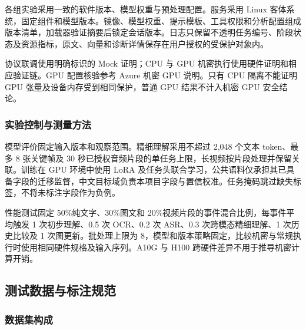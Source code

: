 各组实验采用一致的软件版本、模型权重与预处理配置。服务采用 Linux 客体系统，固定组件和模型版本。镜像、模型权重、提示模板、工具权限和分析配置组成版本清单，加载器验证摘要后锁定会话版本。日志只保留不透明任务编号、阶段状态及资源指标，原文、向量和诊断详情保存在用户授权的受保护对象内。

协议联调使用明确标识的 Mock 证明；CPU 与 GPU 机密执行使用硬件证明和相应验证链。GPU 配置核验参考 Azure 机密 GPU 说明\cite{ref33}。只有 CPU 隔离不能证明 GPU 张量及设备内存受到相同保护，普通 GPU 结果不计入机密 GPU 安全结论。

\subsubsection{实验控制与测量方法}\label{section:3.2.3}

模型评价固定输入版本和观察范围。精细理解采用不超过 2,048 个文本 token、最多 8 张关键帧及 30 秒已授权音频片段的单任务上限，长视频按片段处理并保留关联。训练在 GPU 环境中使用 LoRA 及任务头联合学习，公共语料仅承担其已具备字段的迁移监督，中文目标域负责本项目字段与置信校准。任务掩码跳过缺失标签，不将未标注字段作为负例。

性能测试固定 50\%纯文字、30\%图文和 20\%视频片段的事件混合比例，每事件平均触发 1 次初步理解、0.5 次 OCR、0.2 次 ASR、0.3 次跨模态精细理解、1 次历史比较及 1 次图更新。批处理上限为 8，模型和版本策略固定，比较机密与常规执行时使用相同硬件规格及输入序列。A10G 与 H100 跨硬件差异不用于推导机密计算开销。

\subsection{测试数据与标注规范}\label{section:3.3}

\subsubsection{数据集构成}\label{section:3.3.1}

